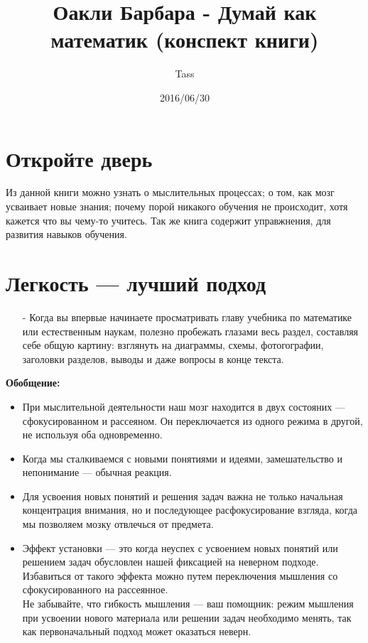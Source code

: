 \documentclass{article}
\begin{document}
\title{Оакли Барбара - Думай как математик (конспект книги)}
\author{Tass}
\date{2016/06/30}
\maketitle

\tableofcontents
\newpage

\section{Откройте дверь}
Из данной книги можно узнать о мыслительных процессах; о том, как мозг усваивает новые знания; почему порой никакого обучения не происходит, хотя кажется что вы чему-то учитесь. Так же книга содержит управжнения, для развития навыков обучения.

\section{Легкость --- лучший подход}
\begin{itemize}
\item[-] Когда вы впервые начинаете просматривать главу учебника по математике или естественным наукам, полезно пробежать глазами весь раздел, составляя себе общую картину: взглянуть на диаграммы, схемы, фотогографии, заголовки разделов, выводы и даже вопросы в конце текста.
\end{itemize}
\textbf{Обобщение:}
\begin{itemize}
\item При мыслительной деятельности наш мозг находится в двух состояних --- сфокусированном и рассеяном. Он переключается из одного режима в другой, не используя оба одновременно.
\item Когда мы сталкиваемся с новыми понятиями и идеями, замешательство и непонимание --- обычная реакция.
\item Для усвоения новых понятий и решения задач важна не только начальная концентрация внимания, но и последующее расфокусирование взгляда, когда мы позволяем мозку отвлечься от предмета.
\item Эффект установки --- это когда неуспех с усвоением новых понятий или решением задач обусловлен нашей фиксацией на неверном подходе. Избавиться от такого эффекта можно путем переключения мышления со сфокусированного на рассеянное.\\Не забывайте, что гибкость мышления --- ваш помощник: режим мышления при усвоении нового материала или решении задач необходимо менять, так как первоначальный подход может оказаться неверн.
\end{itemize}
\end{document}
